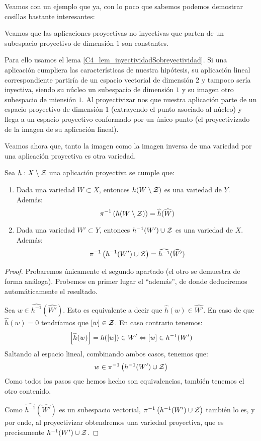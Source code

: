Veamos con un ejemplo que ya, con lo poco que sabemos podemos demostrar cosillas bastante interesantes:
\begin{exa}
	Veamos que las aplicaciones proyectivas no inyectivas que parten de un subespacio proyectivo de dimensión $1$ son constantes.
	
	Para ello usamos el lema \ref{C4_lem_inyectividadSobreyectividad}. Si una aplicación cumpliera las características de nuestra hipótesis, su aplicación lineal correspondiente partiría de un espacio vectorial de dimensión $2$ y tampoco sería inyectiva, siendo su núcleo un subespacio de dimensión $1$ y su imagen otro subespacio de miensión $1$. Al proyectivizar nos que nuestra aplicación parte de un espacio proyectivo de dimensión $1$ (extrayendo el punto asociado al núcleo) y llega a un espacio proyectivo conformado por un único punto (el proyectivizado de la imagen de su aplicación lineal).
\end{exa}
Veamos ahora que, tanto la imagen como la imagen inversa de una variedad por una aplicación proyectiva es otra variedad.
\begin{lem}
	\label{C4_lem_preservaVariedades}
	Sea $h:X\setminus\mathcal{Z}$ una aplicación proyectiva se cumple que:
	\begin{enumerate}
		\item Dada una variedad $W\subset X$, entonces $h(W\setminus\mathcal{Z})$ es una variedad de $Y$. Además: \[\pi^{-1}\left(h(W\setminus \mathcal{Z})\right)=\widehat{h}(\widehat{W})\]
		\item Dada una variedad $W'\subset Y$, entonces $h^{-1}(W')\cup\mathcal{Z}$ es una variedad de $X$. Además: \[\pi^{-1}\left(h^{-1}(W')\cup\mathcal{Z}\right)=\widehat{h^{-1}}(\widehat{W'})\]
	\end{enumerate}
\end{lem}
\begin{proof}
	Probaremos únicamente el segundo apartado (el otro se demuestra de forma análoga). Probemos en primer lugar el ``además'', de donde deduciremos automáticamente el resultado.
	
	Sea $w\in \widehat{h^{-1}}(\widehat{W'})$. Esto es equivalente a decir que $\widehat{h}(w)\in\widehat{W'}$. En caso de que $\widehat{h}(w)=0$ tendríamos que $\left [ w \right ]\in\mathcal{Z}$. En caso contrario tenemos:
	\[\left [ \widehat{h}(w) \right ]=h(\left [ w \right ])\in W'\Leftrightarrow\left [ w \right ]\in h^{-1}(W')\]
	Saltando al espacio lineal, combinando ambos casos, tenemos que:
	\[w\in\pi^{-1}\left(h^{-1}(W')\cup\mathcal{Z}\right)\]
	Como todos los pasos que hemos hecho son equivalencias, también tenemos el otro contenido.
	
	Como $\widehat{h^{-1}}(\widehat{W'})$ es un subespacio vectorial, $\pi^{-1}\left(h^{-1}(W')\cup\mathcal{Z}\right)$ también lo es, y por ende, al proyectivizar obtendremos una variedad proyectiva, que es precisamente $h^{-1}(W')\cup\mathcal{Z}$.
\end{proof}

